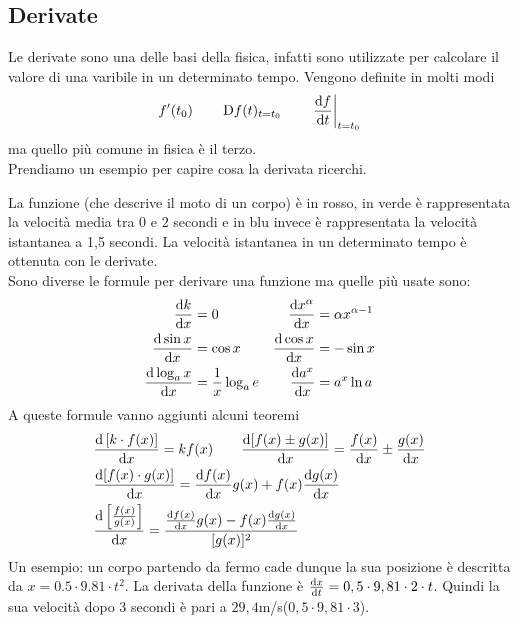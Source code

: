 \subsection{Derivate}
Le derivate sono una delle basi della fisica, infatti sono utilizzate per calcolare il valore di 
una varibile in un determinato tempo. Vengono definite in molti modi 
\begin{equation*}
  f'(t_0) \qquad \mathop{}\!\mathrm{D} f(t)_{t=t_0}\qquad \left.\frac{\mathop{}\!\mathrm{d} f}{\mathop{}\!\mathrm{d} t}\right|_{t=t_0}
\end{equation*}
ma quello più comune in fisica è il terzo.\\
Prendiamo un esempio per capire cosa la derivata ricerchi.
\begin{center}
\end{center}
La funzione (che descrive il moto di un corpo) è in rosso, in verde è rappresentata la velocità 
media tra $0$ e $2$ secondi e in blu invece è rappresentata la velocità istantanea a 1,5 secondi. 
La velocità istantanea in un determinato tempo è ottenuta con le derivate.\\
Sono diverse le formule per derivare una funzione ma quelle più usate sono:
\begin{align*}
  \frac{\dif k}{\dif x}&=0 &\quad \frac{\dif x^\alpha}{\dif x}&=\alpha x^{\alpha-1}\\
  \frac{\dif\sin x}{\dif x}&=\cos x & \frac{\dif\cos x}{\dif x}&=-\sin x\\
  \frac{\dif\log_ax}{\dif x}&=\frac{1}{x}\log_ae & \frac{\dif a^{x}}{\dif x}&=a^{x}\ln a
\end{align*}
A queste formule vanno aggiunti alcuni teoremi
\begin{align*}
  &\frac{\dif\left[k\cdot f(x) \right]}{\dif x}=kf(x)\qquad
  \frac{\dif[f(x)\pm g(x)]}{\dif x}=\frac{f(x)}{\dif x}\pm \frac{g(x)}{\dif x}\\
    &\frac{\dif [f(x)\cdot g(x)]}{\dif x}=\frac{\dif f(x)}{\dif x}g(x) + 
    f(x)\frac{\dif g(x)}{\dif x}\\
  &\frac{\dif \left[\frac{f(x)}{g(x)}\right]}{\dif x} =
    \frac{\frac{\dif f(x)}{\dif x}g(x)-f(x)\frac{\dif g(x)}{\dif x}}{[g(x)]^2}
\end{align*}
Un esempio: un corpo partendo da fermo cade dunque la sua posizione è descritta da 
$x=0.5\cdot9.81\cdot t^{2}$. La derivata della funzione è 
$\frac{\mathop{}\!\mathrm{d} x}{\mathop{}\!\mathrm{d} t}=0,5\cdot9,81\cdot2\cdot t$. 
Quindi la sua velocità dopo 3 secondi è pari a $29,4$m/s($0,5\cdot9,81\cdot3$).

